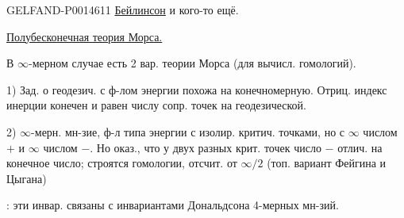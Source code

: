 \begin{GelfandAdjacentEvidence}{GELFAND-P001461}{1}
\underline{Бейлинсон}  и кого-то ещё.

\underline{Полубесконечная теория Морса.}

В \(\infty\)-мерном случае есть 2 вар. теории Морса (для вычисл. гомологий).

1) Зад. о геодезич. с ф-лом энергии похожа на конечномерную.
Отриц. индекс инерции конечен и равен числу сопр. точек на геодезической.

2) \(\infty\)-мерн. мн-зие, ф-л типа энергии
с изолир. критич. точками, но с \(\infty\) числом \(+\) и \(\infty\) числом \(-\).
Но оказ., что у двух разных крит. точек число \(-\) отлич. на конечное число;
строятся гомологии, отсчит. от \(\infty/2\)
(топ. вариант Фейгина и Цыгана)

: эти инвар. связаны с инвариантами Дональдсона 4-мерных мн-зий.

\end{GelfandAdjacentEvidence}

